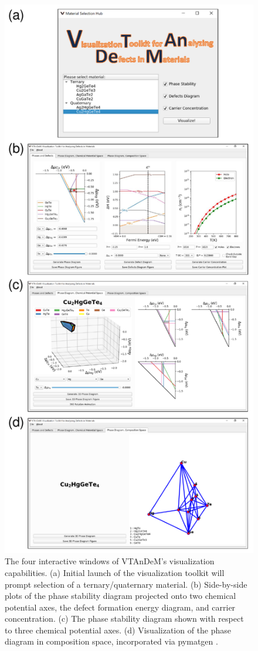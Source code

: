 \documentclass[%
 reprint,
 amsmath,amssymb,
 aps,
]{revtex4-1}
\begin{document}
\begin{figure}
    \centering
    \includegraphics[scale=0.475]{VTAnDeM_VisualizationCapabilities_v4.pdf}
    \caption{The four interactive windows of VTAnDeM's visualization capabilities. (a) Initial launch of the visualization toolkit will prompt selection of a ternary/quaternary material. (b) Side-by-side plots of the phase stability diagram projected onto two chemical potential axes, the defect formation energy diagram, and carrier concentration. (c) The phase stability diagram shown with respect to three chemical potential axes. (d) Visualization of the phase diagram in composition space, incorporated via pymatgen \cite{2013_Ong}.}
    \label{Figure:VTAnDeM_VisualizationCapabilities}
\end{figure}
\end{document}
